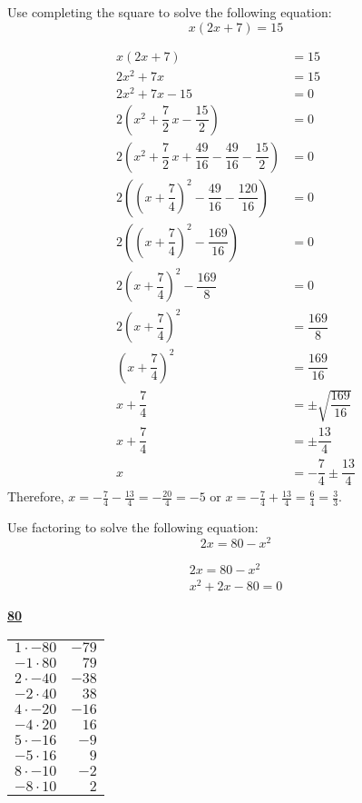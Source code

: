 \documentclass[11pt,letterpaper]{article}
\begin{document}

 Use completing the square to solve the following equation:
	\[
	x(2x + 7)= 15
	\] \pspace

\sol
	\[
	\begin{aligned}
	x(2x + 7)&= 15 \\[0.3cm]
	2x^2 + 7x&= 15 \\[0.3cm]
	2x^2 + 7x - 15&= 0 \\[0.3cm]
	2 \left(x^2 + \dfrac{7}{2}\,x - \dfrac{15}{2} \right)&= 0 \\[0.3cm]
	2 \left(x^2 + \dfrac{7}{2}\,x + \dfrac{49}{16} - \dfrac{49}{16} - \dfrac{15}{2} \right)&= 0 \\[0.3cm]
	2 \left( \left(x + \dfrac{7}{4} \right)^2 - \dfrac{49}{16} - \dfrac{120}{16} \right)&= 0 \\[0.3cm]
	2 \left( \left(x + \dfrac{7}{4} \right)^2  - \dfrac{169}{16} \right)&= 0 \\[0.3cm]
	2 \left(x + \dfrac{7}{4} \right)^2  - \dfrac{169}{8}&= 0 \\[0.3cm]
	2 \left(x + \dfrac{7}{4} \right)^2&= \dfrac{169}{8} \\[0.3cm] 
	\left(x + \dfrac{7}{4} \right)^2&= \dfrac{169}{16} \\[0.3cm]
	x + \dfrac{7}{4}&= \pm \sqrt{\dfrac{169}{16}} \\[0.3cm]
	x + \dfrac{7}{4}&= \pm \dfrac{13}{4} \\[0.3cm]
	x&= -\dfrac{7}{4} \pm \dfrac{13}{4}
	\end{aligned}
	\]
Therefore, $x= -\frac{7}{4} - \frac{13}{4}= -\frac{20}{4}= -5$ or $x= -\frac{7}{4} + \frac{13}{4}= \frac{6}{4}= \frac{3}{3}$. 


\newpage



 Use factoring to solve the following equation:
	\[
	2x= 80 - x^2
	\] \pspace

\sol
	\[
	\begin{aligned}
	2x= 80 - x^2 \\[0.3cm]
	x^2 + 2x - 80= 0 
	\end{aligned}
	\]

	\begin{table}[!ht]
	\centering
	\underline{\bfseries 80} \pvspace{0.2cm}
	\begin{tabular}{rr}
	$1 \cdot -80$ & $-79$ \\
	$-1 \cdot 80$ & $79$ \\
	$2 \cdot -40$ & $-38$ \\
	$-2 \cdot 40$ & $38$ \\
	$4 \cdot -20$ & $-16$ \\
	$-4 \cdot 20$ & $16$ \\
	$5 \cdot -16$ & $-9$ \\
	$-5 \cdot 16$ & $9$ \\
	$8 \cdot -10$ & $-2$ \\ \hline
	\multicolumn{1}{|r}{$-8 \cdot 10$} & \multicolumn{1}{r|}{$2$} \\ \hline
	\end{tabular}
	\end{table}
\end{document}
